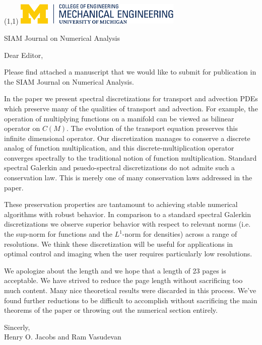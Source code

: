 \documentclass{letter}
\begin{document}
\begin{textblock}{1}(1,1)
  \includegraphics[width=80mm]{CoE-ME-horiz-PMS}
\end{textblock}
\begin{letter}{SIAM Journal on Numerical Analysis}
\opening{Dear Editor,}
Please find attached a manuscript that we would like to submit for
publication in the SIAM Journal on Numerical Analysis.

In the paper we present spectral discretizations for transport and advection PDEs which preserve many of the qualities of transport and advection.
For example, the operation of multiplying functions on a manifold can be viewed as bilinear operator on $C(M)$.
The evolution of the transport equation preserves this infinite dimensional operator.
Our discretization manages to conserve a discrete analog of function multiplication, and this discrete-multiplication operator converges spectrally to the traditional notion of function multiplication.
Standard spectral Galerkin and psuedo-spectral discretizations do not admite such a conservation law.
This is merely one of many conservation laws addressed in the paper.

These preservation properties are tantamount to achieving stable numerical algorithms with robust behavior.
In comparison to a standard spectral Galerkin discretizations we observe superior behavior with respect to relevant norms (i.e. the sup-norm for functions and the $L^{1}$-norm for densities)
across a range of resolutions.
We think these discretization will be useful for applications in optimal control and imaging when the user requires particularly low resolutions.

We apologize about the length and we hope that a length of 23 pages is acceptable.  We have strived to reduce the page length without sacrificing too much content.
Many nice theoretical results were discarded in this process.
We've found further reductions to be difficult to accomplish without sacrificing the main theorems of the paper or throwing out the numerical section entirely.

\closing{Sincerly,\\
Henry O. Jacobs and Ram Vasudevan
}

\end{letter}
\end{document}

